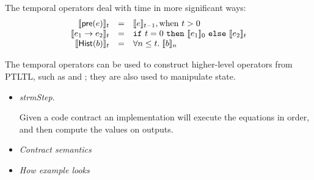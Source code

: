 The temporal operators deal with time in more significant ways:
\[
\begin{array}{rcl}
\sem{\konst{pre}(e)}_t & = & \sem{e}_{t-1}, \mathrm{when}\ t > 0 \\
\sem{e_1 \to e_2}_t & = & \itelse{t=0}{\sem{e_1}_0}{\sem{e_2}_t} \\
\sem{\konst{Hist}(b)}_t & = & \forall n \leq t.\; \sem{b}_n
\end{array}
\]

The temporal operators can be used to construct higher-level operators
from PTLTL, such as  and ; they are also used
to manipulate state.

\begin{itemize}
\item \textit{strmStep}.

Given a code contract an implementation will execute the equations in
order, and then compute the values on outputs.


\item \textit{Contract semantics}

\item \textit{How example looks}

\end{itemize}
